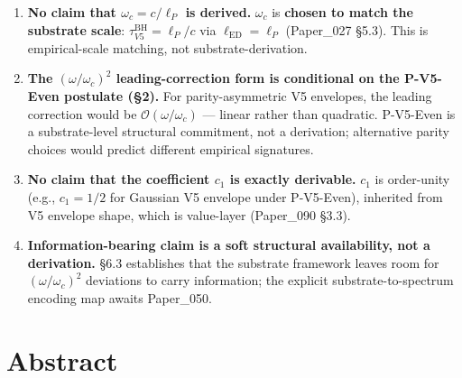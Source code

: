 \documentclass[11pt,a4paper]{article}
\begin{document}
\begin{enumerate}[noitemsep]
\item \textbf{No claim that $\omega_c = c/\ell_P$ is derived.} $\omega_c$ is \textbf{chosen to match the substrate scale}: $\tau_{V5}^\mathrm{BH} = \ell_P/c$ via $\ell_\mathrm{ED} = \ell_P$ (Paper\_027 \S5.3). This is empirical-scale matching, not substrate-derivation.
\item \textbf{The $(\omega/\omega_c)^2$ leading-correction form is conditional on the P-V5-Even postulate (\S2).} For parity-asymmetric V5 envelopes, the leading correction would be $\mathcal{O}(\omega/\omega_c)$ --- linear rather than quadratic. P-V5-Even is a substrate-level structural commitment, not a derivation; alternative parity choices would predict different empirical signatures.
\item \textbf{No claim that the coefficient $c_1$ is exactly derivable.} $c_1$ is order-unity (e.g., $c_1 = 1/2$ for Gaussian V5 envelope under P-V5-Even), inherited from V5 envelope shape, which is value-layer (Paper\_090 \S3.3).
\item \textbf{Information-bearing claim is a soft structural availability, not a derivation.} \S6.3 establishes that the substrate framework leaves room for $(\omega/\omega_c)^2$ deviations to carry information; the explicit substrate-to-spectrum encoding map awaits Paper\_050.
\end{enumerate}

\section*{Abstract}
\end{document}
